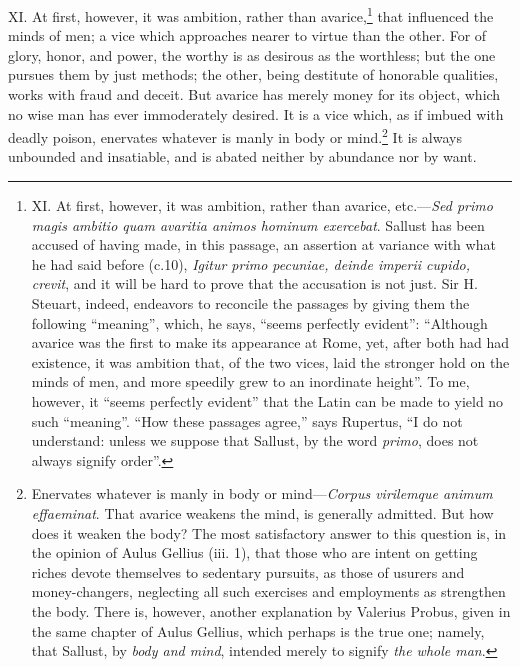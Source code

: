 XI. At first, however, it was ambition, rather than avarice,\footnote{XI. At first, however, it was ambition, rather than avarice,
etc.—\emph{Sed primo magis ambitio quam avaritia animos hominum
exercebat}. Sallust has been accused of having made, in this passage,
an assertion at variance with what he had said before (c.10), \emph{Igitur
primo pecuniae, deinde imperii cupido, crevit}, and it will be hard to
prove that the accusation is not just. Sir H. Steuart, indeed,
endeavors to reconcile the passages by giving them the following
``meaning'', which, he says, ``seems perfectly evident'': ``Although
avarice was the first to make its appearance at Rome, yet, after both
had had existence, it was ambition that, of the two vices, laid the
stronger hold on the minds of men, and more speedily grew to an
inordinate height''. To me, however, it ``seems perfectly evident'' that
the Latin can be made to yield no such ``meaning''. ``How these passages
agree,'' says Rupertus, ``I do not understand: unless we suppose that
Sallust, by the word \emph{primo}, does not always signify order''.} that
influenced the minds of men; a vice which approaches nearer to virtue
than the other. For of glory, honor, and power, the worthy is as
desirous as the worthless; but the one pursues them by just methods;
the other, being destitute of honorable qualities, works with fraud
and deceit. But avarice has merely money for its object, which no wise
man has ever immoderately desired. It is a vice which, as if imbued
with deadly poison, enervates whatever is manly in body or mind.\footnote{Enervates whatever is manly in body or mind—\emph{Corpus
virilemque animum effaeminat}. That avarice weakens the mind, is
generally admitted. But how does it weaken the body? The most
satisfactory answer to this question is, in the opinion of Aulus
Gellius (iii. 1), that those who are intent on getting riches devote
themselves to sedentary pursuits, as those of usurers and
money-changers, neglecting all such exercises and employments as
strengthen the body. There is, however, another explanation by
Valerius Probus, given in the same chapter of Aulus Gellius, which
perhaps is the true one; namely, that Sallust, by \emph{body and mind},
intended merely to signify \emph{the whole man}.}
It is always unbounded and insatiable, and is abated neither by
abundance nor by want.

